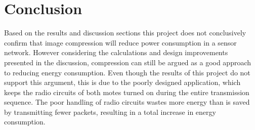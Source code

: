 \chapter{Conclusion}
Based on the results and discussion sections this project does not conclusively confirm that image compression will reduce power consumption in a sensor network. However considering the calculations and design improvements presented in the discussion, compression can still be argued as a good approach to reducing energy consumption. Even though the results of this project do not support this argument, this is due to the poorly designed application, which keeps the radio circuits of both motes turned on during the entire transmission sequence. The poor handling of radio circuits wastes more energy than is saved by transmitting fewer packets, resulting in a total increase in energy consumption. 
